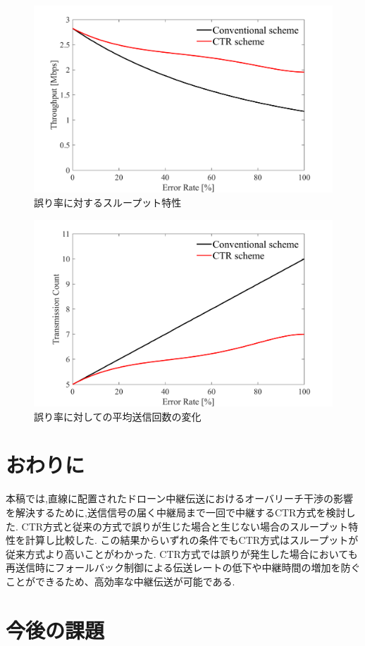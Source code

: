 \documentclass[a4paper,10.5pt]{ltjsarticle}
\begin{document}
\begin{figure}[H]
  \centering
  \includegraphics[width=\linewidth]{throughput_probabilistic_retry_v3.pdf} %
  \caption{誤り率に対するスループット特性}
  \label{fig:throughput_v3} %
\end{figure}
\begin{figure}[H]
  \centering
  \includegraphics[width=\linewidth]{throughput_probabilistic_retry_v3.1.pdf} %
  \caption{誤り率に対しての平均送信回数の変化}
  \label{fig:throughput_v3.1} %
\end{figure}
\clearpage
\section{おわりに}
本稿では,直線に配置されたドローン中継伝送におけるオーバリーチ干渉の影響を解決するために,送信信号の届く中継局まで一回で中継するCTR方式を検討した.
CTR方式と従来の方式で誤りが生じた場合と生じない場合のスループット特性を計算し比較した.
この結果からいずれの条件でもCTR方式はスループットが従来方式より高いことがわかった.
CTR方式では誤りが発生した場合においても再送信時にフォールバック制御による伝送レートの低下や中継時間の増加を防ぐことができるため、高効率な中継伝送が可能である.
\section{今後の課題}
\end{document}
